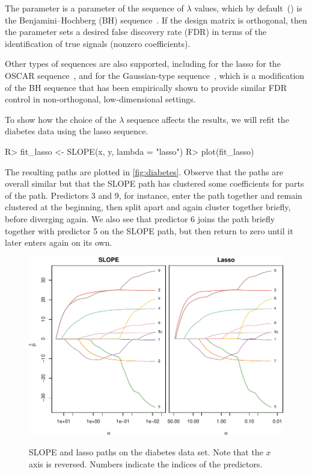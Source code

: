 \documentclass[article]{jss}
\makeatletter
\let\natwidth\Gin@nat@width
\makeatother
\begin{document}
The  parameter is a parameter of the sequence of \(\lambda\) values,
which by default~() is the Benjamini--Hochberg (BH)
sequence~\citep{bogdan2015}. If the design matrix is orthogonal, then the
 parameter sets a desired false discovery rate (FDR) in terms
of the identification of true signals (nonzero coefficients).

Other types of sequences are also supported,
including  for the lasso
 for the OSCAR sequence~\citep{bondell2008}, and
 for the Gaussian-type sequence~\citep{bogdan2015},
which is a modification of the BH sequence that has been empirically shown to
provide similar FDR control in non-orthogonal, low-dimensional settings.

To show how the choice of the \(\lambda\) sequence affects the
results, we will refit the diabetes data using the lasso sequence.

\begin{Code}
R> fit_lasso <- SLOPE(x, y, lambda = "lasso")
R> plot(fit_lasso)
\end{Code}

The resulting paths are plotted in \autoref{fig:diabetes}. Observe that the
paths are overall similar but that the SLOPE path has clustered
some coefficients for parts of the path. Predictors 3 and 9, for instance,
enter the path together and remain clustered at the beginning, then
split apart and again cluster together briefly, before diverging again.
We also see that predictor 6 joins the path briefly together
with predictor 5 on the SLOPE path, but then return to zero until
it later enters again on its own.

\begin{figure}[tp]
  \centering
  {\includegraphics[width=\natwidth]{images/diabetes-slope-lasso.pdf}}
  \caption{%
    SLOPE and lasso paths on the diabetes
    data set. Note that the \(x\) axis is reversed. Numbers indicate
    the indices of the predictors.
  }
  \label{fig:diabetes}
\end{figure}
\end{document}
